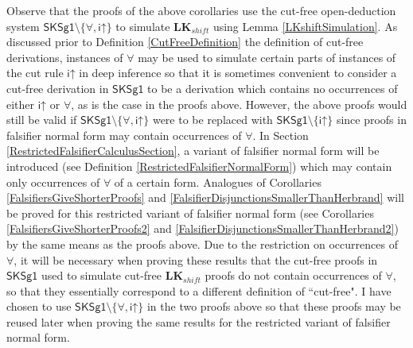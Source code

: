 \documentclass[10pt]{article}
\theoremstyle{definition}\newtheorem{remark}[theorem]{Remark}
\theoremstyle{definition}\newtheorem{example}[theorem]{Example}
\theoremstyle{definition}\newtheorem{definition}[theorem]{Definition}
\newcommand{\SKSq}{{\mathsf{SKSg1}}}
\newcommand{\iUp}{{\mathsf{i\mathord\uparrow}}}
\begin{document}
	Observe that the proofs of the above corollaries use the cut-free open-deduction system $\SKSq \setminus \{\forall, \iUp\}$ to simulate $\textbf{LK}_{shift}$ using Lemma \ref{LKshiftSimulation}. As discussed prior to Definition \ref{CutFreeDefinition} the definition of cut-free derivations, instances of $\forall$ may be used to simulate certain parts of instances of the cut rule $\iUp$ in deep inference so that it is sometimes convenient to consider a cut-free derivation in $\SKSq$ to be a derivation which contains no occurrences of either $\iUp$ or $\forall$, as is the case in the proofs above. However, the above proofs would still be valid if $\SKSq \setminus \{\forall, \iUp\}$ were to be replaced with $\SKSq \setminus \{\iUp\}$ since proofs in falsifier normal form may contain occurrences of $\forall$. In Section \ref{RestrictedFalsifierCalculusSection}, a variant of falsifier normal form will be introduced (see Definition \ref{RestrictedFalsifierNormalForm}) which may contain only occurrences of $\forall$ of a certain form. Analogues of Corollaries \ref{FalsifiersGiveShorterProofs} and \ref{FalsifierDisjunctionsSmallerThanHerbrand} will be proved for this restricted variant of falsifier normal form (see Corollaries \ref{FalsifiersGiveShorterProofs2} and \ref{FalsifierDisjunctionsSmallerThanHerbrand2}) by the same means as the proofs above. Due to the restriction on occurrences of $\forall$, it will be necessary when proving these results that the cut-free proofs in $\SKSq$ used to simulate cut-free $\textbf{LK}_{shift}$ proofs do not contain occurrences of $\forall$, so that they essentially correspond to a different definition of ``cut-free". I have chosen to use $\SKSq \setminus \{\forall, \iUp\}$ in the two proofs above so that these proofs may be reused later when proving the same results for the restricted variant of falsifier normal form.
	
\end{document}
